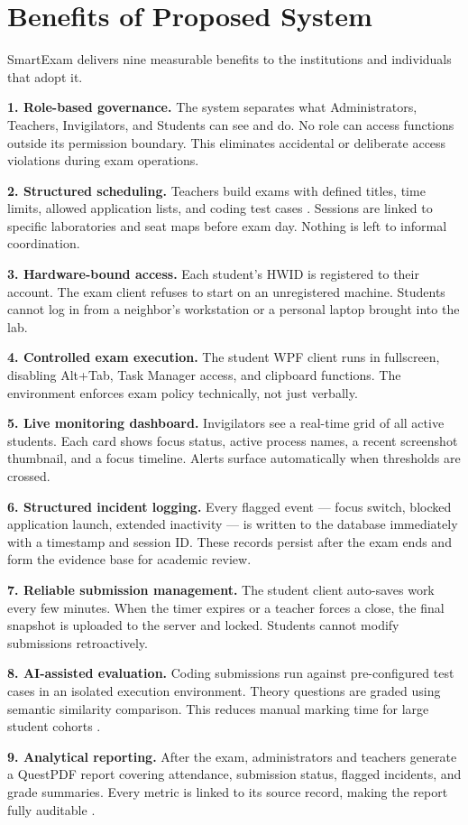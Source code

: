 \section{Benefits of Proposed System}

SmartExam delivers nine measurable benefits to the institutions and individuals that adopt it.

\textbf{1. Role-based governance.} The system separates what Administrators, Teachers, Invigilators, and Students can see and do. No role can access functions outside its permission boundary. This eliminates accidental or deliberate access violations during exam operations.

\textbf{2. Structured scheduling.} Teachers build exams with defined titles, time limits, allowed application lists, and coding test cases \cite{eassess1}. Sessions are linked to specific laboratories and seat maps before exam day. Nothing is left to informal coordination.

\textbf{3. Hardware-bound access.} Each student's HWID is registered to their account. The exam client refuses to start on an unregistered machine. Students cannot log in from a neighbor's workstation or a personal laptop brought into the lab.

\textbf{4. Controlled exam execution.} The student WPF client runs in fullscreen, disabling Alt+Tab, Task Manager access, and clipboard functions. The environment enforces exam policy technically, not just verbally.

\textbf{5. Live monitoring dashboard.} Invigilators see a real-time grid of all active students. Each card shows focus status, active process names, a recent screenshot thumbnail, and a focus timeline. Alerts surface automatically when thresholds are crossed.

\textbf{6. Structured incident logging.} Every flagged event — focus switch, blocked application launch, extended inactivity — is written to the database immediately with a timestamp and session ID. These records persist after the exam ends and form the evidence base for academic review.

\textbf{7. Reliable submission management.} The student client auto-saves work every few minutes. When the timer expires or a teacher forces a close, the final snapshot is uploaded to the server and locked. Students cannot modify submissions retroactively.

\textbf{8. AI-assisted evaluation.} Coding submissions run against pre-configured test cases in an isolated execution environment. Theory questions are graded using semantic similarity comparison. This reduces manual marking time for large student cohorts \cite{spp1}.

\textbf{9. Analytical reporting.} After the exam, administrators and teachers generate a QuestPDF report covering attendance, submission status, flagged incidents, and grade summaries. Every metric is linked to its source record, making the report fully auditable \cite{sommerville}.
